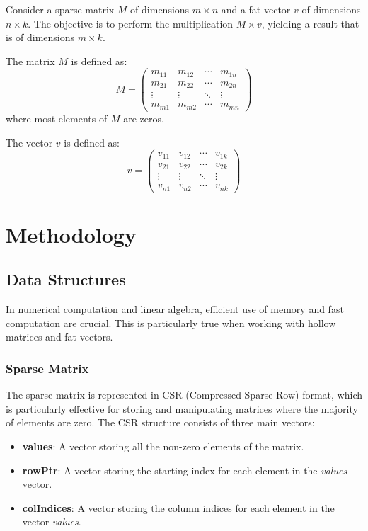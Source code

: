 \documentclass[12pt,oneside]{book} %
\begin{document}
Consider a sparse matrix $M$ of dimensions $m \times n$ and a fat vector $v$ of
dimensions $n \times k$. The objective is to perform the multiplication $M
    \times v$, yielding a result that is of dimensions $m \times k$.

The matrix $M$ is defined as:
\begin{equation}
    M = \begin{pmatrix}
        m_{11} & m_{12} & \cdots & m_{1n} \\
        m_{21} & m_{22} & \cdots & m_{2n} \\
        \vdots & \vdots & \ddots & \vdots \\
        m_{m1} & m_{m2} & \cdots & m_{mn}
    \end{pmatrix}
\end{equation}\label{eq:sparse-matrix}
where most elements of $M$ are zeros.

The vector $v$ is defined as:
\begin{equation}
    v = \begin{pmatrix}
        v_{11} & v_{12} & \cdots & v_{1k} \\
        v_{21} & v_{22} & \cdots & v_{2k} \\
        \vdots & \vdots & \ddots & \vdots \\
        v_{n1} & v_{n2} & \cdots & v_{nk}
    \end{pmatrix}\label{eq:dense-vector}
\end{equation}

\chapter{Methodology}
\section{Data Structures}
In numerical computation and linear algebra, efficient use of memory and fast
computation are crucial. This is particularly true when working with hollow
matrices and fat vectors.

\subsection{Sparse Matrix}
The sparse matrix is represented in CSR (Compressed Sparse Row) format, which
is particularly effective for storing and manipulating matrices where the
majority of elements are zero. The CSR structure consists of three main
vectors:
\begin{itemize}
    \item \textbf{values}: A vector storing all the non-zero elements of the matrix.
    \item \textbf{rowPtr}: A vector storing the starting index for each element in the
          \textit{values} vector.
    \item \textbf{colIndices}: A vector storing the column indices for each element in the vector \textit{values}.
          \
\end{itemize}
\end{document}
